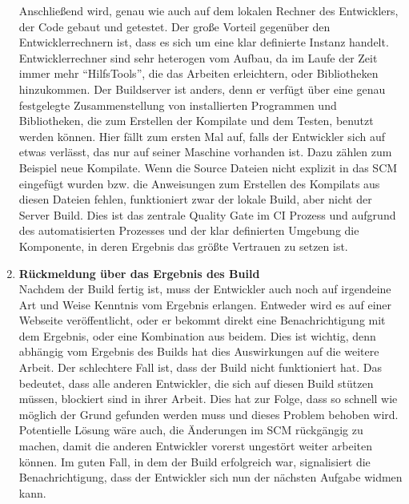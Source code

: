 \begin{enumerate}
		Anschließend wird, genau wie auch auf dem lokalen Rechner des Entwicklers, der Code gebaut und getestet. Der große Vorteil gegenüber den Entwicklerrechnern ist, dass es sich um eine klar definierte Instanz handelt. Entwicklerrechner sind sehr heterogen vom Aufbau, da im Laufe der Zeit immer mehr "`HilfsTools"', die das Arbeiten erleichtern, oder Bibliotheken hinzukommen. Der Buildserver ist anders, denn er verfügt über eine genau festgelegte Zusammenstellung von installierten Programmen und Bibliotheken, die zum Erstellen der Kompilate und dem Testen, benutzt werden können. Hier fällt zum ersten Mal auf, falls der Entwickler sich auf etwas verlässt, das nur auf seiner Maschine vorhanden ist. Dazu zählen zum Beispiel neue Kompilate. Wenn die Source Dateien nicht explizit in das SCM eingefügt wurden bzw. die Anweisungen zum Erstellen des Kompilats aus diesen Dateien fehlen, funktioniert zwar der lokale Build, aber nicht der Server Build. Dies ist das zentrale Quality Gate im CI Prozess und aufgrund des automatisierten Prozesses und der klar definierten Umgebung die Komponente, in deren Ergebnis das größte Vertrauen zu setzen ist.
		\item \textbf{Rückmeldung über das Ergebnis des Build}\\%
		Nachdem der Build fertig ist, muss der Entwickler auch noch auf irgendeine Art und Weise Kenntnis vom Ergebnis erlangen. Entweder wird es auf einer Webseite veröffentlicht, oder er bekommt direkt eine Benachrichtigung mit dem Ergebnis, oder eine Kombination aus beidem. Dies ist wichtig, denn abhängig vom Ergebnis des Builds hat dies Auswirkungen auf die weitere Arbeit. Der schlechtere Fall ist, dass der Build nicht funktioniert hat. Das bedeutet, dass alle anderen Entwickler, die sich auf diesen Build stützen müssen, blockiert sind in ihrer Arbeit. Dies hat zur Folge, dass so schnell wie möglich der Grund gefunden werden muss und dieses Problem behoben wird. Potentielle Lösung wäre auch, die Änderungen im SCM rückgängig zu machen, damit die anderen Entwickler vorerst ungestört weiter arbeiten können. Im guten Fall, in dem der Build erfolgreich war, signalisiert die Benachrichtigung, dass der Entwickler sich nun der nächsten Aufgabe widmen kann.
\end{enumerate}
